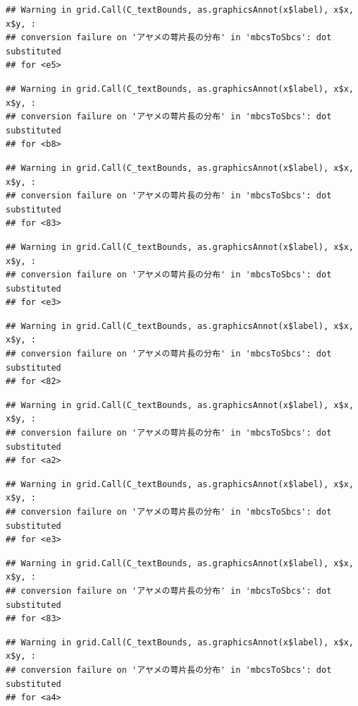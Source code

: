 \documentclass[
]{book}
\begin{document}
\begin{verbatim}
## Warning in grid.Call(C_textBounds, as.graphicsAnnot(x$label), x$x, x$y, :
## conversion failure on 'アヤメの萼片長の分布' in 'mbcsToSbcs': dot substituted
## for <e5>
\end{verbatim}

\begin{verbatim}
## Warning in grid.Call(C_textBounds, as.graphicsAnnot(x$label), x$x, x$y, :
## conversion failure on 'アヤメの萼片長の分布' in 'mbcsToSbcs': dot substituted
## for <b8>
\end{verbatim}

\begin{verbatim}
## Warning in grid.Call(C_textBounds, as.graphicsAnnot(x$label), x$x, x$y, :
## conversion failure on 'アヤメの萼片長の分布' in 'mbcsToSbcs': dot substituted
## for <83>
\end{verbatim}

\begin{verbatim}
## Warning in grid.Call(C_textBounds, as.graphicsAnnot(x$label), x$x, x$y, :
## conversion failure on 'アヤメの萼片長の分布' in 'mbcsToSbcs': dot substituted
## for <e3>
\end{verbatim}

\begin{verbatim}
## Warning in grid.Call(C_textBounds, as.graphicsAnnot(x$label), x$x, x$y, :
## conversion failure on 'アヤメの萼片長の分布' in 'mbcsToSbcs': dot substituted
## for <82>
\end{verbatim}

\begin{verbatim}
## Warning in grid.Call(C_textBounds, as.graphicsAnnot(x$label), x$x, x$y, :
## conversion failure on 'アヤメの萼片長の分布' in 'mbcsToSbcs': dot substituted
## for <a2>
\end{verbatim}

\begin{verbatim}
## Warning in grid.Call(C_textBounds, as.graphicsAnnot(x$label), x$x, x$y, :
## conversion failure on 'アヤメの萼片長の分布' in 'mbcsToSbcs': dot substituted
## for <e3>
\end{verbatim}

\begin{verbatim}
## Warning in grid.Call(C_textBounds, as.graphicsAnnot(x$label), x$x, x$y, :
## conversion failure on 'アヤメの萼片長の分布' in 'mbcsToSbcs': dot substituted
## for <83>
\end{verbatim}

\begin{verbatim}
## Warning in grid.Call(C_textBounds, as.graphicsAnnot(x$label), x$x, x$y, :
## conversion failure on 'アヤメの萼片長の分布' in 'mbcsToSbcs': dot substituted
## for <a4>
\end{verbatim}
\end{document}
